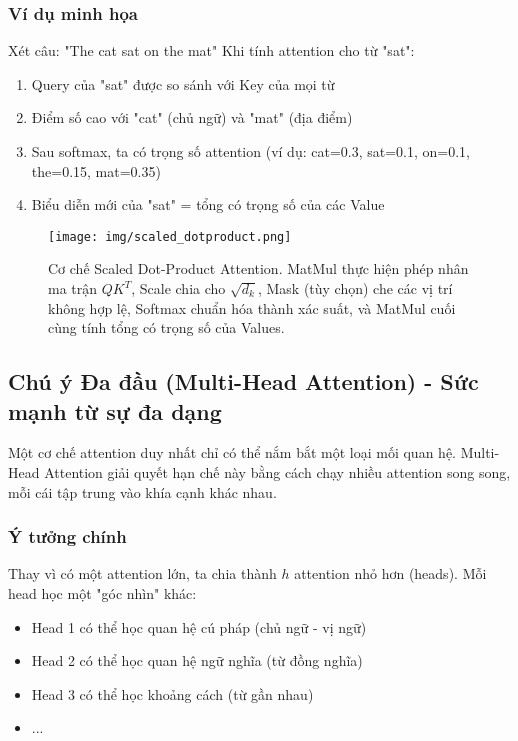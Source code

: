 \subsubsection{Ví dụ minh họa}
Xét câu: "The cat sat on the mat"
Khi tính attention cho từ "sat":
\begin{enumerate}
    \item Query của "sat" được so sánh với Key của mọi từ
    \item Điểm số cao với "cat" (chủ ngữ) và "mat" (địa điểm)
    \item Sau softmax, ta có trọng số attention (ví dụ: cat=0.3, sat=0.1, on=0.1, the=0.15, mat=0.35)
    \item Biểu diễn mới của "sat" = tổng có trọng số của các Value
\end{enumerate}

\begin{figure}[H]
    \centering
    \texttt{[image: img/scaled\_dotproduct.png]}
    \caption{Cơ chế Scaled Dot-Product Attention. MatMul thực hiện phép nhân ma trận $QK^T$, Scale chia cho $\sqrt{d_k}$, Mask (tùy chọn) che các vị trí không hợp lệ, Softmax chuẩn hóa thành xác suất, và MatMul cuối cùng tính tổng có trọng số của Values.}
    \label{fig:scaled_dot_product_attention}
\end{figure}

\subsection{Chú ý Đa đầu (Multi-Head Attention) - Sức mạnh từ sự đa dạng}
\label{ssec:multi_head_attention}
Một cơ chế attention duy nhất chỉ có thể nắm bắt một loại mối quan hệ. Multi-Head Attention giải quyết hạn chế này bằng cách chạy nhiều attention song song, mỗi cái tập trung vào khía cạnh khác nhau.

\subsubsection{Ý tưởng chính}
Thay vì có một attention lớn, ta chia thành $h$ attention nhỏ hơn (heads). Mỗi head học một "góc nhìn" khác:
\begin{itemize}
    \item Head 1 có thể học quan hệ cú pháp (chủ ngữ - vị ngữ)
    \item Head 2 có thể học quan hệ ngữ nghĩa (từ đồng nghĩa)
    \item Head 3 có thể học khoảng cách (từ gần nhau)
    \item ...
\end{itemize}

